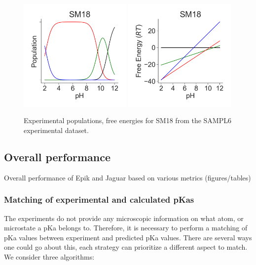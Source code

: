 \documentclass[9pt,lineno]{elife}
\begin{document}
\begin{figure}[H]
    \centering
    \includegraphics[width=0.49\textwidth]{Images/Experiment/SM18/population-curve.png}
    \includegraphics[width=0.49\textwidth]{Images/Experiment/SM18/free-energy-curve.png}
    \caption{Experimental populations, free energies for SM18 from the SAMPL6 experimental dataset.}
    \label{fig:titrationcurve}
\end{figure}

\subsection{Overall performance}

Overall performance of Epik and Jaguar based on various metrics (figures/tables)
\subsubsection {Matching of experimental and calculated pKas}

The experiments do not provide any microscopic information on what atom, or microstate a pKa belongs to.
%
Therefore, it is necessary to perform a matching of pKa values between experiment and predicted pKa values.
%
There are several ways one could go about this, each strategy can prioritize a different aspect to match.
%
We consider three algorithms:
\end{document}
